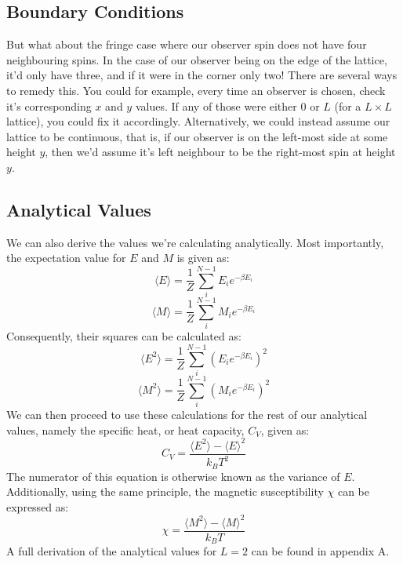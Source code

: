 \documentclass{article}
\begin{document}
\subsection{Boundary Conditions}
But what about the fringe case where our observer spin does not have four neighbouring spins. In the case of our observer being on the edge of the lattice, it'd only have three, and if it were in the corner only two! \newline
There are several ways to remedy this. You could for example, every time an observer is chosen, check it's corresponding $x$ and $y$ values. If any of those were either 0 or $L$ (for a $L\times L$ lattice), you could fix it accordingly. Alternatively, we could instead assume our lattice to be continuous, that is, if our observer is on the left-most side at some height $y$, then we'd assume it's left neighbour to be the right-most spin at height $y$.
\subsection{Analytical Values} \label{anal}
We can also derive the values we're calculating analytically. Most importantly, the expectation value for $E$ and $M$ is given as:
\begin{equation}
    \langle E \rangle = \frac{1}{Z} \sum_i^{N-1} E_i e^{-\beta E_i}
\end{equation}
\begin{equation} \label{m}
    \langle M \rangle = \frac{1}{Z} \sum_i^{N-1} M_i e^{-\beta E_i}
\end{equation}
Consequently, their squares can be calculated as:
\begin{equation}
    \langle E^2 \rangle = \frac{1}{Z} \sum_i^{N-1} (E_i e^{-\beta E_i})^2
\end{equation}
\begin{equation}
    \langle M^2 \rangle = \frac{1}{Z} \sum_i^{N-1} (M_i e^{-\beta E_i})^2
\end{equation}
We can then proceed to use these calculations for the rest of our analytical values, namely the specific heat, or heat capacity, $C_V$, given as:
\begin{equation}
    C_V = \frac{\langle E^2 \rangle - \langle E \rangle^2}{k_B T^2}
\end{equation}
The numerator of this equation is otherwise known as the variance of $E$.\newline
Additionally, using the same principle, the magnetic susceptibility $\chi$ can be expressed as:
\begin{equation}
    \chi = \frac{\langle M^2 \rangle - \langle M \rangle^2}{k_B T}
\end{equation}
A full derivation of the analytical values for $L = 2$ can be found in appendix A.
\newpage
\end{document}

